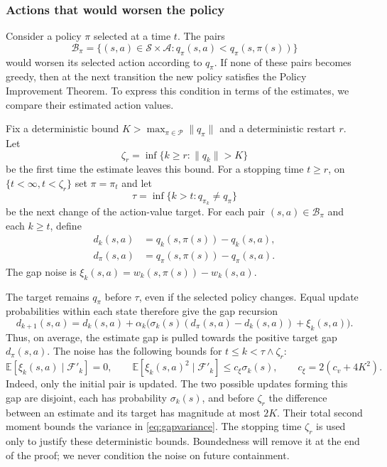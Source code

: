 \subsubsection{Actions that would worsen the policy}
Consider a policy $\pi$ selected at a time $t$. The pairs
\[
\mathcal B_\pi=\big\{(s,a)\in\mathcal S\times\mathcal A:
q_\pi(s,a)<q_\pi(s,\pi(s))\big\}
\]
would worsen its selected action according to $q_\pi$. If none of these pairs becomes greedy, then at the next transition the new policy satisfies the Policy Improvement Theorem. To express this condition in terms of the estimates, we compare their estimated action values.

\begin{definition}
\label{def: gap variables}
Fix a deterministic bound $K>\max_{\pi\in\mathcal P}\|q_\pi\|$ and a deterministic restart $r$. Let
\[
\zeta_r=\inf\{k\ge r:\|q_k\|>K\}
\]
be the first time the estimate leaves this bound.
For a stopping time $t\ge r$, on $\{t<\infty,t<\zeta_r\}$ set $\pi=\pi_t$ and let
\[
\tau=\inf\{k>t:q_{\pi_k}\ne q_\pi\}
\]
be the next change of the action-value target.
For each pair $(s,a)\in\mathcal B_\pi$ and each $k\ge t$, define
\begin{align}
\label{eq:gaps}
d_k(s,a)&=q_k(s,\pi(s))-q_k(s,a),\\
d_\pi(s,a)&=q_\pi(s,\pi(s))-q_\pi(s,a).
\end{align}
The gap noise is $\xi_k(s,a)=w_k(s,\pi(s))-w_k(s,a)$.
\end{definition}

The target remains $q_\pi$ before $\tau$, even if the selected policy changes. Equal update probabilities within each state therefore give the gap recursion
\begin{equation}
\label{eq:gapdrift}
d_{k+1}(s,a)=d_k(s,a)+\alpha_k\big(\sigma_k(s)(d_\pi(s,a)-d_k(s,a))+\xi_k(s,a)\big).
\end{equation}
Thus, on average, the estimate gap is pulled towards the positive target gap $d_\pi(s,a)$. The noise has the following bounds for $t\le k<\tau\wedge\zeta_r$:
\begin{equation}
\label{eq:gapvariance}
\mathbb E[\xi_k(s,a)\mid\mathcal F'_k]=0,
\qquad
\mathbb E[\xi_k(s,a)^2\mid\mathcal F'_k]\le c_\xi\sigma_k(s),
\qquad c_\xi=2(c_v+4K^2).
\end{equation}
Indeed, only the initial pair is updated. The two possible updates forming this gap are disjoint, each has probability $\sigma_k(s)$, and before $\zeta_r$ the difference between an estimate and its target has magnitude at most $2K$. Their total second moment bounds the variance in \eqref{eq:gapvariance}.
The stopping time $\zeta_r$ is used only to justify these deterministic bounds. Boundedness will remove it at the end of the proof; we never condition the noise on future containment.

